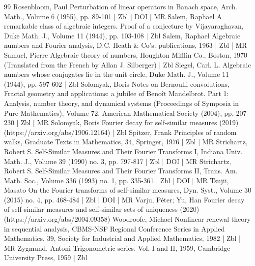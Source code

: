 \begin{thebibliography}{99}
Rosenbloom, Paul Perturbation of linear operators in Banach space, Arch. Math., Volume 6 (1955), pp. 89-101 | Zbl | DOI | MR
Salem, Raphael A remarkable class of algebraic integers. Proof of a conjecture by Vijayaraghavan, Duke Math. J., Volume 11 (1944), pp. 103-108 | Zbl
Salem, Raphael Algebraic numbers and Fourier analysis, D.C. Heath \& Co’s. publications, 1963 | Zbl | MR
Samuel, Pierre Algebraic theory of numbers, Houghton Mifflin Co., Boston, 1970 (Translated from the French by Allan J. Silberger) | Zbl
Siegel, Carl. L. Algebraic numbers whose conjugates lie in the unit circle, Duke Math. J., Volume 11 (1944), pp. 597-602 | Zbl
Solomyak, Boris Notes on Bernoulli convolutions, Fractal geometry and applications: a jubilee of Benoît Mandelbrot. Part 1: Analysis, number theory, and dynamical systems (Proceedings of Symposia in Pure Mathematics), Volume 72, American Mathematical Society (2004), pp. 207-230 | Zbl | MR
Solomyak, Boris Fourier decay for self-similar measures (2019) (https://arxiv.org/abs/1906.12164) | Zbl
Spitzer, Frank Principles of random walks, Graduate Texts in Mathematics, 34, Springer, 1976 | Zbl | MR
Strichartz, Robert S. Self-Similar Measures and Their Fourier Transforms I, Indiana Univ. Math. J., Volume 39 (1990) no. 3, pp. 797-817 | Zbl | DOI | MR
Strichartz, Robert S. Self-Similar Measures and Their Fourier Transforms II, Trans. Am. Math. Soc., Volume 336 (1993) no. 1, pp. 335-361 | Zbl | DOI | MR
Tsujii, Masato On the Fourier transforms of self-similar measures, Dyn. Syst., Volume 30 (2015) no. 4, pp. 468-484 | Zbl | DOI | MR
Varju, Péter; Yu, Han Fourier decay of self-similar measures and self-similar sets of uniqueness (2020) (https://arxiv.org/abs/2004.09358)
Woodroofe, Michael Nonlinear renewal theory in sequential analysis, CBMS-NSF Regional Conference Series in Applied Mathematics, 39, Society for Industrial and Applied Mathematics, 1982 | Zbl | MR
Zygmund, Antoni Trigonometric series. Vol. I and II, 1959, Cambridge University Press, 1959 | Zbl
\end{thebibliography}
